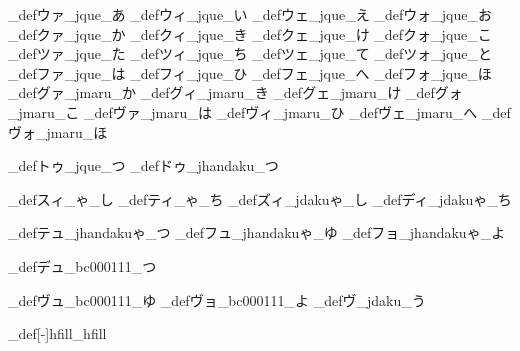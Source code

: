 \brl@char_def{ウァ}{\brl@char@alias_jque\brl@char@alias_あ}
\brl@char_def{ウィ}{\brl@char@alias_jque\brl@char@alias_い}
\brl@char_def{ウェ}{\brl@char@alias_jque\brl@char@alias_え}
\brl@char_def{ウォ}{\brl@char@alias_jque\brl@char@alias_お}
\brl@char_def{クァ}{\brl@char@alias_jque\brl@char@alias_か}
\brl@char_def{クィ}{\brl@char@alias_jque\brl@char@alias_き}
\brl@char_def{クェ}{\brl@char@alias_jque\brl@char@alias_け}
\brl@char_def{クォ}{\brl@char@alias_jque\brl@char@alias_こ}
\brl@char_def{ツァ}{\brl@char@alias_jque\brl@char@alias_た}
\brl@char_def{ツィ}{\brl@char@alias_jque\brl@char@alias_ち}
\brl@char_def{ツェ}{\brl@char@alias_jque\brl@char@alias_て}
\brl@char_def{ツォ}{\brl@char@alias_jque\brl@char@alias_と}
\brl@char_def{ファ}{\brl@char@alias_jque\brl@char@alias_は}
\brl@char_def{フィ}{\brl@char@alias_jque\brl@char@alias_ひ}
\brl@char_def{フェ}{\brl@char@alias_jque\brl@char@alias_へ}
\brl@char_def{フォ}{\brl@char@alias_jque\brl@char@alias_ほ}
\brl@char_def{グァ}{\brl@char@alias_jmaru\brl@char@alias_か}
\brl@char_def{グィ}{\brl@char@alias_jmaru\brl@char@alias_き}
\brl@char_def{グェ}{\brl@char@alias_jmaru\brl@char@alias_け}
\brl@char_def{グォ}{\brl@char@alias_jmaru\brl@char@alias_こ}
\brl@char_def{ヴァ}{\brl@char@alias_jmaru\brl@char@alias_は}
\brl@char_def{ヴィ}{\brl@char@alias_jmaru\brl@char@alias_ひ}
\brl@char_def{ヴェ}{\brl@char@alias_jmaru\brl@char@alias_へ}
\brl@char_def{ヴォ}{\brl@char@alias_jmaru\brl@char@alias_ほ}


\brl@char_def{トゥ}{\brl@char@alias_jque\brl@char@alias_つ}
\brl@char_def{ドゥ}{\brl@char@alias_jhandaku\brl@char@alias_つ}

\brl@char_def{スィ}{\brl@char@alias_ゃ\brl@char@alias_し}
\brl@char_def{ティ}{\brl@char@alias_ゃ\brl@char@alias_ち}
\brl@char_def{ズィ}{\brl@char@alias_jdakuゃ\brl@char@alias_し}
\brl@char_def{ディ}{\brl@char@alias_jdakuゃ\brl@char@alias_ち}

\brl@char_def{テュ}{\brl@char@alias_jhandakuゃ\brl@char@alias_つ}
\brl@char_def{フュ}{\brl@char@alias_jhandakuゃ\brl@char@alias_ゆ}
\brl@char_def{フョ}{\brl@char@alias_jhandakuゃ\brl@char@alias_よ}

\brl@char_def{デュ}{\brl@char_bc000111\brl@char@alias_つ}

\brl@char_def{ヴュ}{\brl@char_bc000111\brl@char@alias_ゆ}
\brl@char_def{ヴョ}{\brl@char_bc000111\brl@char@alias_よ}
\brl@char_def{ヴ}{\brl@char@alias_jdaku\brl@char@alias_う}




\brl@char_def[-]{hfill}{\brl@char@alias_hfill}%

